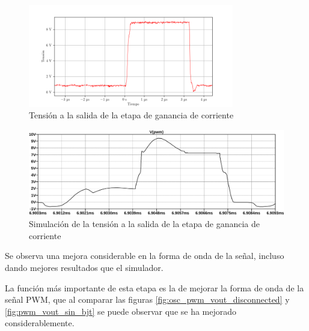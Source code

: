 
\begin{figure}[H]
    \centering
    \includegraphics[width=0.8\textwidth]{images/capturas-osciloscopio/17-11-2022/3.png}
    \caption{Tensión a la salida de la etapa de ganancia de corriente}
    \label{fig:osc:3}
\end{figure}

\begin{figure}[H]
    \centering
    \includegraphics[width=\textwidth]{images/sim/3.pdf}
    \caption{Simulación de la tensión a la salida de la etapa de ganancia de corriente}
    \label{fig:sim:3}
\end{figure}

Se observa una mejora considerable en la forma de onda de la señal, incluso dando mejores resultados que el simulador. %

La función más importante de esta etapa es la de mejorar la forma de onda de la señal PWM, que al comparar las figuras \ref{fig:osc_pwm_vout_disconnected} y \ref{fig:pwm_vout_sin_bjt} se puede observar que se ha mejorado considerablemente.


